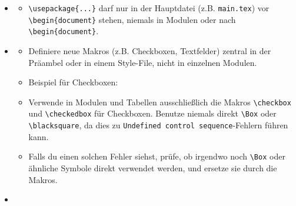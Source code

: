 \begin{itemize}[label=\textcolor{ctmmOrange}{\faArrowRight}]
\tightlist
\item
  \textbf{\textcolor{ctmmBlue}{\1}}

  \begin{itemize}[label=\textcolor{ctmmOrange}{\faArrowRight}]
  \tightlist
  \item
    \texttt{\textbackslash{}usepackage\{...\}} darf nur in der Hauptdatei (z.B. \texttt{main.tex}) vor \texttt{\textbackslash{}begin\{document\}} stehen, niemals in Modulen oder nach \texttt{\textbackslash{}begin\{document\}}.
  \end{itemize}
\item
  \textbf{\textcolor{ctmmBlue}{\1}}

  \begin{itemize}[label=\textcolor{ctmmOrange}{\faArrowRight}]
  \item
    Definiere neue Makros (z.B. Checkboxen, Textfelder) zentral in der Präambel oder in einem Style-File, nicht in einzelnen Modulen.
  \item
    Beispiel für Checkboxen:

\begin{Shaded}
\begin{Highlighting}\checkbox
{}
\NormalTok{\{}\NormalTok{\}}
\NormalTok{\{}\NormalTok{\}\{}\SpecialStringTok{$}\SpecialStringTok{$}\NormalTok{\}}
\NormalTok{\{}\NormalTok{\}\{}\SpecialStringTok{$}\SpecialStringTok{$}\NormalTok{\}}
\end{Highlighting}
\end{Shaded}
  \item
    \textbf{\textcolor{ctmmBlue}{\1}} Verwende in Modulen und Tabellen ausschließlich die Makros \texttt{\textbackslash{}checkbox} und \texttt{\textbackslash{}checkedbox} für Checkboxen. Benutze niemals direkt \texttt{\textbackslash{}Box} oder \texttt{\textbackslash{}blacksquare}, da dies zu \texttt{Undefined\ control\ sequence}-Fehlern führen kann.
  \item
    Falls du einen solchen Fehler siehst, prüfe, ob irgendwo noch \texttt{\textbackslash{}Box} oder ähnliche Symbole direkt verwendet werden, und ersetze sie durch die Makros.
  \end{itemize}
\item
  \textbf{\textcolor{ctmmBlue}{\1}}


\end{itemize}
